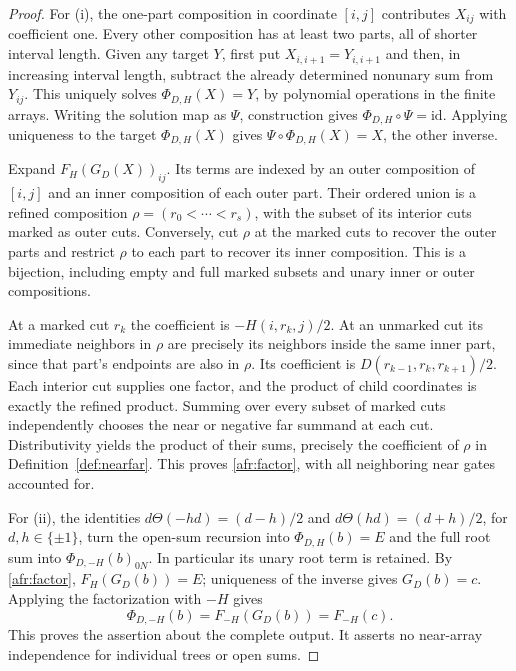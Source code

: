 \begin{proof}\leanok{}
For (i), the one-part composition in coordinate $[i,j]$ contributes
$X_{ij}$ with coefficient one. Every other composition has at least two
parts, all of shorter interval length. Given any target $Y$, first put
$X_{i,i+1}=Y_{i,i+1}$ and then, in increasing interval length, subtract
the already determined nonunary sum from $Y_{ij}$. This uniquely solves
$\Phi_{D,H}(X)=Y$, by polynomial operations in the finite arrays.
Writing the solution map as $\Psi$, construction gives
$\Phi_{D,H}\circ\Psi=\mathrm{id}$. Applying uniqueness to the target
$\Phi_{D,H}(X)$ gives $\Psi\circ\Phi_{D,H}(X)=X$, the other inverse.

Expand $F_H(G_D(X))_{ij}$. Its terms are indexed by an outer
composition of $[i,j]$ and an inner composition of each outer part.
Their ordered union is a refined composition
$\rho=(r_0<\cdots<r_s)$, with the subset of its interior cuts marked
as outer cuts. Conversely, cut $\rho$ at the marked cuts to recover
the outer parts and restrict $\rho$ to each part to recover its inner
composition. This is a bijection, including empty and full marked
subsets and unary inner or outer compositions.

At a marked cut $r_k$ the coefficient is $-H(i,r_k,j)/2$.
At an unmarked cut its immediate neighbors in $\rho$ are precisely
its neighbors inside the same inner part, since that part's endpoints
are also in $\rho$. Its coefficient is
$D(r_{k-1},r_k,r_{k+1})/2$. Each interior cut supplies one factor,
and the product of child coordinates is exactly the refined product.
Summing over every subset of marked cuts independently chooses the
near or negative far summand at each cut. Distributivity yields the
product of their sums, precisely the coefficient of $\rho$ in
Definition~\ref{def:nearfar}. This proves \eqref{afr:factor}, with all
neighboring near gates accounted for.

For (ii), the identities $d\Theta(-hd)=(d-h)/2$ and
$d\Theta(hd)=(d+h)/2$, for $d,h\in\{\pm1\}$, turn the open-sum
recursion into $\Phi_{D,H}(b)=E$ and the full root sum into
$\Phi_{D,-H}(b)_{0N}$. In particular its unary root term is retained.
By \eqref{afr:factor}, $F_H(G_D(b))=E$; uniqueness of the inverse
gives $G_D(b)=c$. Applying the factorization with $-H$ gives
\begin{equation}\label{afr:near-freedom}
\Phi_{D,-H}(b)=F_{-H}(G_D(b))=F_{-H}(c).
\end{equation}
This proves the assertion about the complete output. It asserts no
near-array independence for individual trees or open sums.


\end{proof}
